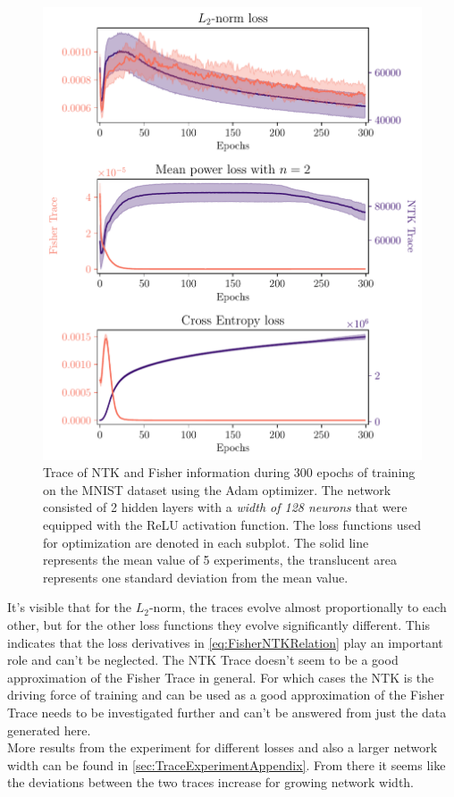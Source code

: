 \begin{figure}
	\centering
	\includegraphics{text/results/FisherNTKComparisonPlots/Triple_comparison_losses2_128.pdf}
	\caption{Trace of NTK and Fisher information during 300 epochs of training on the MNIST dataset using the Adam optimizer. The network consisted of 2 hidden layers with a \emph{width of 128 neurons} that were equipped with the ReLU activation function. The loss functions used for optimization are denoted in each subplot. The solid line represents the mean value of 5 experiments, the translucent area represents one standard deviation from the mean value.}
	\label{fig:MNISTTraceComparison}
\end{figure}
It's visible that for the $L_2$-norm, the traces evolve almost proportionally to each other, but for the other loss functions they evolve significantly different. This indicates that the loss derivatives in \cref{eq:FisherNTKRelation} play an important role and can't be neglected. The NTK Trace doesn't seem to be a good approximation of the Fisher Trace in general. For which cases the NTK is the driving force of training and can be used as a good approximation of the Fisher Trace needs to be investigated further and can't be answered from just the data generated here.\\
More results from the experiment for different losses and also a larger network width can be found in \cref{sec:TraceExperimentAppendix}. From there it seems like the deviations between the two traces increase for growing network width. 